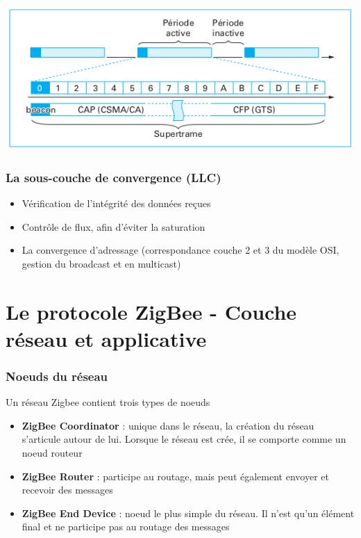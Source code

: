 \documentclass{beamer}
\begin{document}
  \begin{frame}
    \begin{center}
    \includegraphics[scale=0.6]{Supertrame.png}
    \end{center} 
  \end{frame}


  \begin{frame}
    \frametitle{La sous-couche de convergence (LLC)}
    \begin{itemize}
      \item Vérification de l'intégrité des données reçues
      \item Contrôle de flux, afin d'éviter la saturation
      \item La convergence d'adressage (correspondance couche 2 et 3 du modèle OSI, gestion du broadcast et en multicast)
    \end{itemize}
  \end{frame}

  \section{Le protocole ZigBee - Couche réseau et applicative}

  \begin{frame}
   \frametitle{Noeuds du réseau}
   \begin{block}{Un réseau Zigbee contient trois types de noeuds}
      \begin{itemize}
	\item \textbf{ZigBee Coordinator} : unique dans le réseau, la création du réseau s'articule autour de lui. Lorsque le réseau est crée, il se comporte comme un noeud routeur
	\item \textbf{ZigBee Router} : participe au routage, mais peut également envoyer et recevoir des messages
	\item \textbf{ZigBee End Device} : noeud le plus simple du réseau. Il n'est qu'un élément final et ne participe pas au routage des messages
      \end{itemize}
    \end{block}	
  \end{frame}
  
\end{document}
